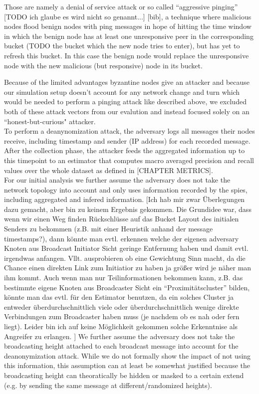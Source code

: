 Those are namely a denial of service attack or so called ``aggressive pinging'' [TODO ich glaube es wird nicht so genannt...] [bib], a technique where malicious nodes flood
benign nodes with ping messages in hope of hitting the time window in which the benign node has at least one unresponsive
peer in the corresponding bucket (TODO the bucket which the new node tries to enter), but has yet to refresh this bucket. In this case
the benign node would replace the unresponsive node with the new malicious (but responsive) node in its bucket.

Because of the limited advantages byzantine nodes give an attacker and because our simulation setup doesn't account for any network change and turn
which would be needed to perform a pinging attack like described above,
we excluded both of these attack vectors from our evalution and instead focused solely on an ``honest-but-curious" attacker. \\


To perform a deanynomization attack, the adversary logs all messages their nodes receive,
including timestamp and sender (IP address) for each recorded message. After the collection phase,
the attacker feeds the aggregated information up to this timepoint to an estimator that
computes macro averaged precision and recall values over the whole dataset as defined in
[CHAPTER METRICS]. \\

For our initial analysis we further assume the adversary does not take the network topology into account
and only uses information recorded by the spies, including aggregated and infered information.
[Ich hab mir zwar Überlegungen dazu gemacht, aber bin zu keinem Ergebnis gekommen.
Die Grundidee war, dass wenn wir einen Weg finden Rückschlüsse auf das Bucket Layout des initialen Senders zu bekommen
(z.B. mit einer Heuristik anhand der message timestamps?), dann könnte man evtl. erkennen welche der eigenen adversary
Knoten aus Broadcast Initiator Sicht geringe Entfernung haben und damit evtl. irgendwas anfangen. Vllt. ausprobieren
ob eine Gewichtung Sinn macht, da die Chance einen direkten Link zum Initiatior zu haben ja größer wird je näher man ihm kommt.
Auch wenn man nur Teilinformationen bekommen kann, z.B. das bestimmte eigene Knoten aus Broadcaster Sicht ein ``Proximitätscluster''
bilden, könnte man das evtl. für den Estimator benutzen, da ein solches Cluster ja entweder überdurchschnittlich viele
oder überdurchschnittlich wenige direkte Verbindungen zum Broadcaster haben muss (je nachdem ob es nah oder fern liegt).
Leider bin ich auf keine Möglichkeit gekommen solche Erkenntnise als Angreifer zu erlangen.
]
We further assume the adversary does not take the broadcasting height attached to each broadcast message into account
for the deanonymization attack. While we do not formally show the impact of not using this information,
this assumption can at least be somewhat justified because the broadcasting height can
theoratically be hidden or masked to a certain extend (e.g. by sending the same message at different/randomized heights).


